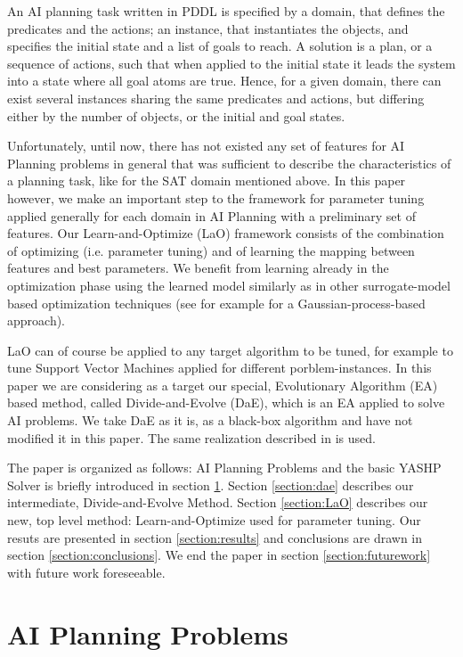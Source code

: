 \documentclass{acm_proc_article-sp}
\begin{document}
An AI planning task written in PDDL is specified by a domain, that defines the predicates and the actions; an instance, that instantiates the objects, and specifies the initial state and a list of goals to reach. A solution is a plan, or a sequence of actions, such that when applied to the initial state it leads the system into a state where all goal atoms are true. Hence, for a given domain, there can exist several instances sharing the same predicates and actions, but differing either by the number of objects, or the initial and goal states. 

Unfortunately, until now, there has not existed any set of features for AI Planning problems in general that was sufficient to describe the characteristics of a planning task, like for the SAT domain \cite{Hutter06} mentioned above. In this paper however, we make an important step to the framework for parameter tuning applied generally for each domain in AI Planning with a preliminary set of features. Our Learn-and-Optimize (LaO) framework consists of the combination of optimizing (i.e. parameter tuning) and of learning the mapping between features and best parameters. We benefit from learning already in the optimization phase using the learned model similarly as in other surrogate-model based optimization techniques (see for example \cite{Bardenet} for a Gaussian-process-based approach).

LaO can of course be applied to any target algorithm to be tuned, for example to tune Support Vector Machines applied for different porblem-instances. In this paper we are considering as a target our special, Evolutionary Algorithm (EA) based method, called Divide-and-Evolve (DaE), which is an EA applied to solve AI problems. We take DaE as it is, as a black-box algorithm and have not modified it in this paper. The same realization described in \cite{BibEvoCop:2010} is used. 

The paper is organized as follows: AI Planning Problems and the basic YASHP Solver is briefly introduced in section \ref{section:planning}. Section \ref{section:dae} describes our intermediate, Divide-and-Evolve Method. Section \ref{section:LaO} describes our new, top level method: Learn-and-Optimize used for parameter tuning. Our resuts are presented in section \ref{section:results} and conclusions are drawn in section \ref{section:conclusions}. We end the paper in section \ref{section:futurework} with future work foreseeable.

\section{AI Planning Problems}
\label{section:planning}
\end{document}
